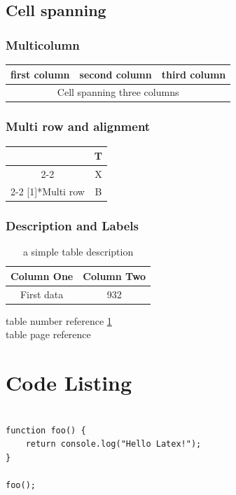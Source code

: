 \documentclass[12pt]{article}
\begin{document}
\subsection{Cell spanning}

\subsubsection{Multicolumn}
\begin{tabular}{|l|l|l|}
\hline
first column & second column & third column \\
\hline
\multicolumn{3}{|c|}{Cell spanning three columns} \\
\hline
\end{tabular}

\subsubsection{Multi row and alignment}

\begin{tabular}{|c|c|}
\hline
& T \\
\cline{2-2}
& X \\
\cline{2-2}
\multirow[c]{-3}[1]{*}{Multi row} & B \bigstrut \\
\hline
\end{tabular}



\subsubsection{Description and Labels}
\begin{table}[H]
\centering
\begin{tabular}{|c|c|}
\hline
\bfseries Column One & \bfseries Column Two\\
\hline
First data & 932\\ \hline
\end{tabular}
\caption{a simple table description}
\label{table:simple}
\end{table}

table number reference \ref{table:simple} \\
table page reference \pageref{table:simple}

\section{Code Listing}
\begin{verbatim}

function foo() {
    return console.log("Hello Latex!");
}

foo();

\end{verbatim}
\end{document}
